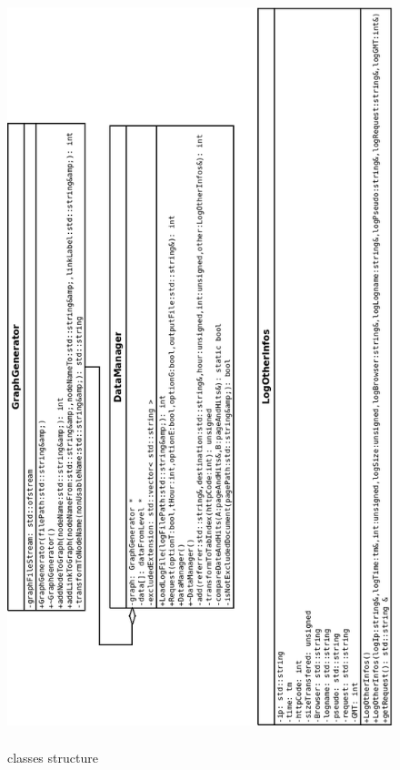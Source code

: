 \documentclass[a4paper, 12pts]{article}
\begin{document}
\begin{figure}[t]
	\caption{classes structure}
	\includegraphics[height=22cm]{../diagrammes/classes/classeDiagram.png}
\end{figure}
\end{document}
